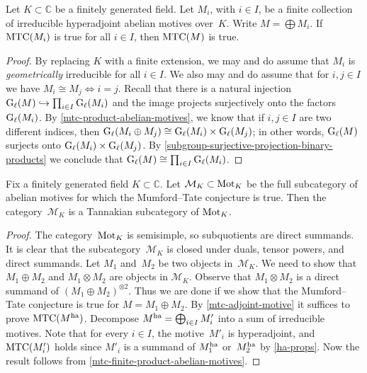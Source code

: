 \documentclass[10pt,twoside,leqno]{article}
\numberwithin{equation}{subsection}
\newcommand{\into}{\hookrightarrow}
\newcommand{\CC}{\mathbb{C}}
\newcommand{\ha}{\textnormal{ha}}
\newcommand{\Mot}{\textnormal{Mot}}
\newcommand{\GG}{\textnormal{G}}
\newcommand{\Gl}{\GG_{\ell}}
\newcommand{\MTC}{\textnormal{MTC}}
\begin{document}
\begin{lemma} %
	\label{mtc-finite-product-abelian-motives}
	Let $K \subset \CC$ be a finitely generated field.
	Let $M_{i}$, with $i \in I$, be a finite collection of
	irreducible hyperadjoint abelian motives over~$K$.
	Write $M = \bigoplus M_{i}$.
	If $\MTC(M_{i})$ is true for all $i \in I$,
	then $\MTC(M)$ is true.
	\begin{proof}
		By replacing $K$ with a finite extension,
		we may and do assume that $M_i$ is \emph{geometrically} irreducible
		for all $i \in I$.
		We also may and do assume that for $i,j \in I$
		we have $M_{i} \cong M_{j} \iff i = j$.
		Recall that there is a natural injection
		$\Gl(M) \into \prod_{i \in I} \Gl(M_{i})$
		and the image projects surjectively onto the factors $\Gl(M_{i})$.
		By \cref{mtc-product-abelian-motives},
		we know that if $i,j \in I$ are two different indices,
		then $\Gl(M_{i} \oplus M_{j}) \cong \Gl(M_{i}) \times \Gl(M_{j})$;
		in other words,
		$\Gl(M)$ surjects onto $\Gl(M_{i}) \times \Gl(M_{j})$.
		By \cref{subgroup-surjective-projection-binary-products}
		we conclude that $\Gl(M) \cong \prod_{i \in I} \Gl(M_{i})$.
	\end{proof}
\end{lemma}

\begin{theorem} %
	\label{mtc-abelian-motives-tannakian-subcategory}
	Fix a finitely generated field $K \subset \CC$.
	Let $\mathcal{M}_K \subset \Mot_K$ be the full subcategory
	of abelian motives for which the Mumford--Tate conjecture is true.
	Then the category~$\mathcal{M}_K$ is a Tannakian subcategory of $\Mot_K$.
	\begin{proof}
		The category~$\Mot_K$ is semisimple,
		so subquotients are direct summands.
		It is clear that the subcategory~$\mathcal{M}_K$
		is closed under duals, tensor powers, and direct summands.
		Let $M_1$ and~$M_2$ be two objects in~$\mathcal{M}_K$.
		We need to show that $M_1 \oplus M_2$
		and $M_1 \otimes M_2$ are objects in $\mathcal{M}_K$.
		Observe that $M_1 \otimes M_2$ is a direct summand of
		$(M_1 \oplus M_2)^{\otimes 2}$.
		Thus we are done if we show that the Mumford--Tate conjecture is true for
		$M = M_1 \oplus M_2$.
		By \cref{mtc-adjoint-motive} it suffices to prove $\MTC(M^\ha)$.
		Decompose $M^\ha = \bigoplus_{i \in I} M'_i$
  into a sum of irreducible motives.
  Note that for every $i \in I$, the motive~$M'_i$ is hyperadjoint,
  and $\MTC(M'_i)$ holds
  since $M'_i$ is a summand of $M_1^\ha$ or~$M_2^\ha$ by \cref{ha-props}.
		Now the result follows from \cref{mtc-finite-product-abelian-motives}.
	\end{proof}
\end{theorem}
\end{document}
